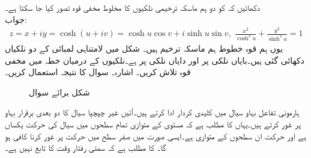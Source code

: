 \quad
دکھائیں کہ  کو دو ہم ماسکہ ترخیمی نلکیوں کا مخلوط مخفی قوہ تصور کیا جا سکتا ہے۔\\
جواب:\quad
\begin{align*}
z=x+iy=\cosh(u+iv)=\cosh u\cos v+i\sinh u\sin v,\,\, \frac{x^2}{\cosh^2 u}+\frac{y^2}{\sinh^2 u}=1
\end{align*} 
یوں ہم قوہ خطوط  ہم ماسکہ ترخیم ہیں۔
\quad
شکل  میں لامتناہی لمبائی کے دو نلکیاں دکھائی گئی ہیں۔بایاں نلکی پر  اور دایاں نلکی پر  ہے۔نلکیوں کے درمیان خطہ میں مخفی قوہ  تلاش کریں۔ اشارہ۔ سوال  کا نتیجہ استعمال کریں۔
\begin{figure}
\centering
{}
\caption{شکل برائے سوال }
\label{شکل_سوال_مخفی_قوہ_دو_نلکی}
\end{figure}

ہارمونی تفاعل بہاو سیال میں کلیدی کردار ادا کرتے ہیں۔آئیں غیر چپچپا سیال کا دو بعدی برقرار بہاو پر غور کرتے ہیں۔یہاں  کا مطلب ہے کہ  مستوی کے متوازی تمام سطحوں میں سیال کی حرکت یکساں ہے اور حرکت ان سطحوں کے متوازی ہے۔ایسی صورت میں صفر  سطح میں حرکت پر غور کرنا کافی ہو گا۔  کا مطلب ہے کہ  سمتی رفتار وقت کا تابع نہیں ہے۔

